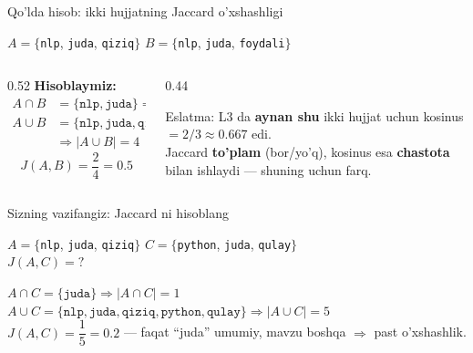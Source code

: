 \documentclass[aspectratio=169,11pt]{beamer}
\begin{document}
\begin{frame}{Qo'lda hisob: ikki hujjatning Jaccard o'xshashligi}
  \begin{tcolorbox}[defbox,title=Kichik misol (so'z to'plamlari)]
    \small
    $A = \{$\texttt{nlp}, \texttt{juda}, \texttt{qiziq}$\}$\qquad
    $B = \{$\texttt{nlp}, \texttt{juda}, \texttt{foydali}$\}$
  \end{tcolorbox}
  \vspace{0.2em}
  \begin{columns}[T]
    \begin{column}{0.52\textwidth}
      \textbf{Hisoblaymiz:}
      \begin{align*}
        A \cap B &= \{\texttt{nlp}, \texttt{juda}\} \Rightarrow |A\cap B| = 2\\
        A \cup B &= \{\texttt{nlp}, \texttt{juda}, \texttt{qiziq}, \texttt{foydali}\}\\
                 &\Rightarrow |A\cup B| = 4
      \end{align*}
      $$ J(A,B) = \frac{2}{4} = \mathbf{0.5} $$
    \end{column}
    \begin{column}{0.44\textwidth}
      \begin{tcolorbox}[okbox,top=2pt,bottom=2pt]
        \footnotesize
        Eslatma: L3 da \textbf{aynan shu} ikki hujjat uchun
        kosinus $= 2/3 \approx 0.667$ edi.\\[3pt]
        Jaccard \textbf{to'plam} (bor/yo'q), kosinus esa
        \textbf{chastota} bilan ishlaydi --- shuning uchun farq.
      \end{tcolorbox}
    \end{column}
  \end{columns}
\end{frame}

\begin{frame}{Sizning vazifangiz: Jaccard ni hisoblang}
  \begin{tcolorbox}[warnbox,title=Savol --- 90 soniya]
    \small
    $A = \{$\texttt{nlp}, \texttt{juda}, \texttt{qiziq}$\}$\qquad
    $C = \{$\texttt{python}, \texttt{juda}, \texttt{qulay}$\}$\\[4pt]
    \textbf{\large $J(A,C) = ?$}
  \end{tcolorbox}
  \pause
  \begin{tcolorbox}[okbox,title=Javob]
    \small
    $A \cap C = \{\texttt{juda}\} \Rightarrow |A\cap C| = 1$\\[2pt]
    $A \cup C = \{\texttt{nlp}, \texttt{juda}, \texttt{qiziq}, \texttt{python}, \texttt{qulay}\}
       \Rightarrow |A\cup C| = 5$\\[3pt]
    $J(A,C) = \dfrac{1}{5} = \mathbf{0.2}$ --- faqat ``juda'' umumiy,
    mavzu boshqa $\Rightarrow$ past o'xshashlik.
  \end{tcolorbox}
\end{frame}
\end{document}
